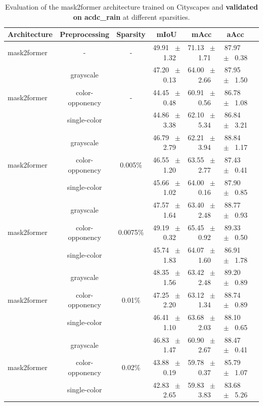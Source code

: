 \begin{table}[h]
  \centering
  \caption{Evaluation of the mask2former architecture trained on Cityscapes and \textbf{validated on acdc_rain} at different sparsities.}
  \begin{tabular}{@{}lccc ccc@{}}
    \toprule
    Architecture & Preprocessing & Sparsity & mIoU & mAcc & aAcc \\
    \midrule
    mask2former & - & - & 49.91 ~$\pm$~ 1.32 & 71.13 ~$\pm$~ 1.71 & 87.97 ~$\pm$~ 0.38 \\
    \midrule
    \midrule
    \multirow{3}{*}{mask2former} & grayscale & \multirow{3}{*}{-} & 47.20 ~$\pm$~ 0.13 & 64.00 ~$\pm$~ 2.66 & 87.95 ~$\pm$~ 1.50 \\
    & color-opponency & & 44.45 ~$\pm$~ 0.48 & 60.91 ~$\pm$~ 0.56 & 86.78 ~$\pm$~ 1.08 \\
    & single-color & & 44.86 ~$\pm$~ 3.38 & 62.10 ~$\pm$~ 5.34 & 86.84 ~$\pm$~ 3.21 \\
    \midrule
    \multirow{3}{*}{mask2former} & grayscale & \multirow{3}{*}{0.005\%} & 46.79 ~$\pm$~ 2.79 & 62.21 ~$\pm$~ 3.94 & 88.84 ~$\pm$~ 1.17 \\
    & color-opponency & & 46.55 ~$\pm$~ 1.20 & 63.55 ~$\pm$~ 2.77 & 87.43 ~$\pm$~ 0.41 \\
    & single-color & & 45.66 ~$\pm$~ 1.02 & 64.00 ~$\pm$~ 0.16 & 87.90 ~$\pm$~ 0.85 \\
    \midrule
    \multirow{3}{*}{mask2former} & grayscale & \multirow{3}{*}{0.0075\%} & 47.57 ~$\pm$~ 1.64 & 63.40 ~$\pm$~ 2.48 & 88.77 ~$\pm$~ 0.93 \\
    & color-opponency & & 49.19 ~$\pm$~ 0.32 & 65.45 ~$\pm$~ 0.92 & 89.33 ~$\pm$~ 0.50 \\
    & single-color & & 45.74 ~$\pm$~ 1.83 & 64.07 ~$\pm$~ 1.60 & 86.91 ~$\pm$~ 1.78 \\
    \midrule
    \multirow{3}{*}{mask2former} & grayscale & \multirow{3}{*}{0.01\%} & 48.35 ~$\pm$~ 1.56 & 63.42 ~$\pm$~ 2.48 & 89.20 ~$\pm$~ 0.89 \\
    & color-opponency & & 47.25 ~$\pm$~ 2.20 & 63.12 ~$\pm$~ 1.34 & 88.74 ~$\pm$~ 0.89 \\
    & single-color & & 46.41 ~$\pm$~ 1.10 & 63.68 ~$\pm$~ 2.03 & 88.10 ~$\pm$~ 0.65 \\
    \midrule
    \multirow{3}{*}{mask2former} & grayscale & \multirow{3}{*}{0.02\%} & 46.83 ~$\pm$~ 1.47 & 60.90 ~$\pm$~ 2.67 & 88.47 ~$\pm$~ 0.41 \\
    & color-opponency & & 43.88 ~$\pm$~ 0.19 & 59.78 ~$\pm$~ 0.37 & 85.79 ~$\pm$~ 1.07 \\
    & single-color & & 42.83 ~$\pm$~ 2.65 & 59.83 ~$\pm$~ 3.83 & 83.68 ~$\pm$~ 5.26 \\
    \midrule
    \bottomrule
  \end{tabular}
  \label{tab:sparse_mask2former_acdc_rain}
\end{table}
